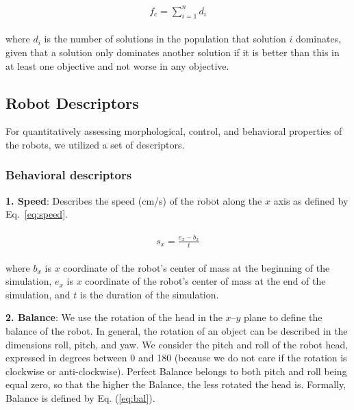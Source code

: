 \documentclass[utf8]{frontiersSCNS} %
\begin{document}
       \begin{eqnarray}
    \label{eq:cons}
    \begin{aligned}
      f_c = \sum_{i=1}^{n}d_i
    \end{aligned} 
    \end{eqnarray}

\noindent where $d_i$ is the number of solutions in the population that solution $i$ dominates, given that a solution only dominates another solution if it is better than this in at least one objective and not worse in any objective.
 


 \subsection{Robot Descriptors}
 For quantitatively assessing morphological, control, and behavioral properties of the robots, we utilized a set of descriptors.\\
  
 \subsubsection{Behavioral descriptors}

  
 
\textbf{1. Speed}: Describes the speed (cm/s) of the robot along the $x$ axis as defined by Eq.~\eqref{eq:speed}.

    \begin{eqnarray}
    \label{eq:speed}
    \begin{aligned}
      s_x = \frac{e_x - b_x}{t}
    \end{aligned} 
    \end{eqnarray}

\noindent where $b_x$ is $x$ coordinate of the robot's center of mass at the beginning of the simulation, $e_x$ is $x$ coordinate of the robot's center of mass at the end of the simulation, and $t$ is the duration of the simulation.


\textbf{2. Balance}:  We use the rotation of the head in the $x$--$y$ plane to define the balance of the robot. In general, the rotation of an object can be described in the dimensions roll, pitch, and yaw. We consider the pitch and roll of the robot head, expressed in degrees between 0 and 180 (because we do not care if the rotation is clockwise or anti-clockwise). Perfect Balance belongs to both pitch and roll being equal zero, so that the higher the Balance, the less rotated the head is. Formally, Balance is defined by Eq. (\ref{eq:bal}).
    
\end{document}
